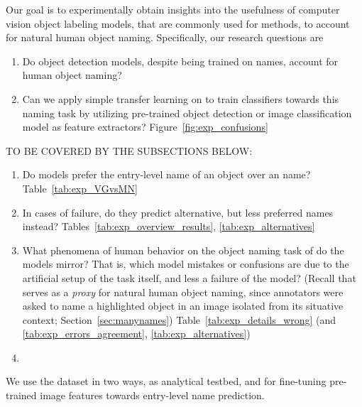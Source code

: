 

Our goal is to experimentally obtain insights into the usefulness of computer vision object labeling models, that are commonly used for \lv methods, to account for natural human object naming. 
Specifically, our research questions are
\begin{enumerate}
	\item Do object detection models, despite being trained on \arbitrary  
	names, account for human object naming?
	\item Can we apply simple transfer learning on \mn to train classifiers towards this naming task by utilizing pre-trained object detection or image classification model as feature extractors? Figure~\ref{fig:exp_confusions} \\
\end{enumerate}
TO BE COVERED BY THE SUBSECTIONS BELOW:
\begin{enumerate}
	\item Do models prefer the entry-level name of an object over an \arbitrary name? Table~\ref{tab:exp_VGvsMN}
	\item In cases of failure, do they predict alternative, but less preferred  names instead? Tables~\ref{tab:exp_overview_results}, \ref{tab:exp_alternatives}
	\item What phenomena of human behavior on the object naming task of \mn do the models mirror? That is, which model mistakes or confusions are due to the artificial setup of the task itself, and less a failure of the model? (Recall that \mn serves as a \textit{proxy} for natural human object naming, since annotators were asked to name a highlighted object in an image isolated from its situative context; Section~\ref{sec:manynames}) Table~\ref{tab:exp_details_wrong} (and \ref{tab:exp_errors_agreement},  \ref{tab:exp_alternatives})
	
	\item {}
\end{enumerate}
We use the \mn dataset in two ways, as analytical testbed, and for fine-tuning pre-trained image features towards entry-level name prediction.


